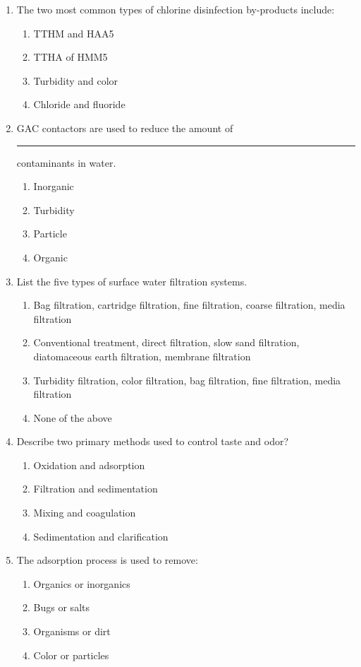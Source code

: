 \documentclass{article}
\begin{document}
\begin{enumerate}
\item The two most common types of chlorine disinfection by-products include:
\begin{enumerate}
\item TTHM and HAA5
\item TTHA of HMM5
\item Turbidity and color
\item Chloride and fluoride
\end{enumerate}

\item GAC contactors are used to reduce the amount of \rule{2cm}{0.5pt} contaminants in water.
\begin{enumerate}
\item Inorganic
\item Turbidity
\item Particle
\item Organic
\end{enumerate}

\item List the five types of surface water filtration systems.
\begin{enumerate}
\item Bag filtration, cartridge filtration, fine filtration, coarse filtration, media filtration
\item Conventional treatment, direct filtration, slow sand filtration, diatomaceous earth filtration, membrane filtration
\item Turbidity filtration, color filtration, bag filtration, fine filtration, media filtration
\item None of the above
\end{enumerate}

\item Describe two primary methods used to control taste and odor?
\begin{enumerate}
\item Oxidation and adsorption
\item Filtration and sedimentation
\item Mixing and coagulation
\item Sedimentation and clarification
\end{enumerate}

\item The adsorption process is used to remove:
\begin{enumerate}
\item Organics or inorganics
\item Bugs or salts
\item Organisms or dirt
\item Color or particles
\end{enumerate}


\end{enumerate}
\end{document}
